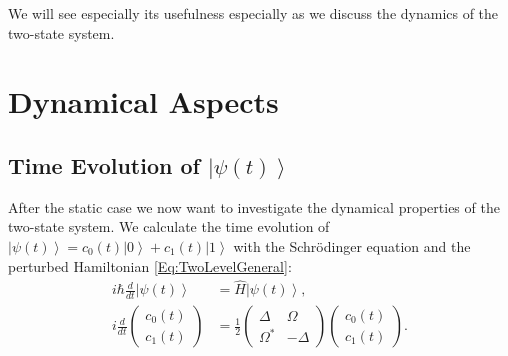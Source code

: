 \documentclass[10pt]{article}
\newcommand{\ket}[1]{\ensuremath{\left|#1\right\rangle}}
\begin{document}
We will see especially its usefulness especially as we discuss the dynamics of the two-state system.

\section{Dynamical Aspects}
\subsection{Time Evolution of $\ket{\psi(t)}$}
 After the static case we now want to investigate the dynamical properties of the two-state system. We calculate the time evolution of $\ket{\psi(t)} = c_0(t)\ket{0} + c_1(t)\ket{1}$ with the Schrödinger equation and the perturbed Hamiltonian \eqref{Eq:TwoLevelGeneral}:
\begin{align}
i\hbar \frac{d}{dt}\ket{\psi(t)}&=\hat{H}\ket{\psi(t)},\\
i \frac{d}{dt}\left(\begin{array}{c} c_0(t) \\ c_1(t) \end{array}\right) &= \frac{1}{2}\left( \begin{array}{cc} \Delta & \Omega \\ \Omega^* & -\Delta \end{array} \right) \left(\begin{array}{c} c_0(t) \\ c_1(t) \end{array} \right).
\end{align}
\end{document}

